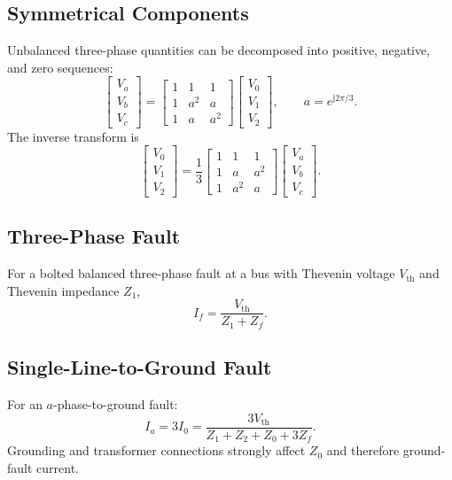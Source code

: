 \documentclass[11pt]{article}
\newcommand{\V}{\mathbf{V}}
\newcommand{\junit}{\mathrm{j}}
\begin{document}
\subsection{Symmetrical Components}
Unbalanced three-phase quantities can be decomposed into positive, negative,
and zero sequences:
\begin{equation}
\begin{bmatrix}V_a\\V_b\\V_c\end{bmatrix}
=
\begin{bmatrix}
1&1&1\\
1&a^2&a\\
1&a&a^2
\end{bmatrix}
\begin{bmatrix}V_0\\V_1\\V_2\end{bmatrix},
\qquad
a=e^{\junit 2\pi/3}.
\end{equation}
The inverse transform is
\begin{equation}
\begin{bmatrix}V_0\\V_1\\V_2\end{bmatrix}
=\frac{1}{3}
\begin{bmatrix}
1&1&1\\
1&a&a^2\\
1&a^2&a
\end{bmatrix}
\begin{bmatrix}V_a\\V_b\\V_c\end{bmatrix}.
\end{equation}

\subsection{Three-Phase Fault}
For a bolted balanced three-phase fault at a bus with Thevenin voltage
$V_{\mathrm{th}}$ and Thevenin impedance $Z_1$,
\begin{equation}
I_f=\frac{V_{\mathrm{th}}}{Z_1+Z_f}.
\end{equation}

\subsection{Single-Line-to-Ground Fault}
For an $a$-phase-to-ground fault:
\begin{equation}
I_a=3I_0=\frac{3V_{\mathrm{th}}}{Z_1+Z_2+Z_0+3Z_f}.
\end{equation}
Grounding and transformer connections strongly affect $Z_0$ and therefore
ground-fault current.
\end{document}
